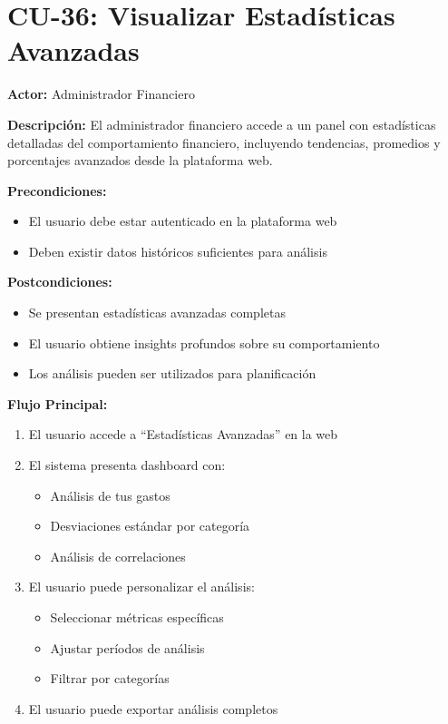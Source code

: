 \section{CU-36: Visualizar Estadísticas Avanzadas}

\noindent\textbf{Actor:} Administrador Financiero

\noindent\textbf{Descripción:} El administrador financiero accede a un panel con estadísticas detalladas del comportamiento financiero, incluyendo tendencias, promedios y porcentajes avanzados desde la plataforma web.

\noindent\textbf{Precondiciones:}
\begin{itemize}
    \item El usuario debe estar autenticado en la plataforma web
    \item Deben existir datos históricos suficientes para análisis
\end{itemize}

\noindent\textbf{Postcondiciones:}
\begin{itemize}
    \item Se presentan estadísticas avanzadas completas
    \item El usuario obtiene insights profundos sobre su comportamiento
    \item Los análisis pueden ser utilizados para planificación
\end{itemize}

\noindent\textbf{Flujo Principal:}
\begin{enumerate}
    \item El usuario accede a ``Estadísticas Avanzadas'' en la web
    \item El sistema presenta dashboard con:
    \begin{itemize}
        \item Análisis de tus gastos 
        \item Desviaciones estándar por categoría
        \item Análisis de correlaciones
    \end{itemize}
    \item El usuario puede personalizar el análisis:
    \begin{itemize}
        \item Seleccionar métricas específicas
        \item Ajustar períodos de análisis
        \item Filtrar por categorías
    \end{itemize}
    \item El usuario puede exportar análisis completos
\end{enumerate}

